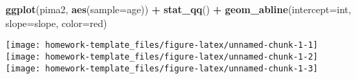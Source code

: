 \documentclass[
]{article}
\newenvironment{Shaded}{\begin{snugshade}}{\end{snugshade}}
\newcommand{\AttributeTok}[1]{\textcolor[rgb]{0.13,0.29,0.53}{#1}}
\newcommand{\FunctionTok}[1]{\textcolor[rgb]{0.13,0.29,0.53}{\textbf{#1}}}
\newcommand{\NormalTok}[1]{#1}
\newcommand{\SpecialCharTok}[1]{\textcolor[rgb]{0.81,0.36,0.00}{\textbf{#1}}}
\newcommand{\StringTok}[1]{\textcolor[rgb]{0.31,0.60,0.02}{#1}}
\begin{document}
\begin{enumerate}
\begin{Shaded}
\begin{Highlighting}[]
\FunctionTok{ggplot}\NormalTok{(pima2, }\FunctionTok{aes}\NormalTok{(}\AttributeTok{sample=}\NormalTok{age)) }\SpecialCharTok{+} \FunctionTok{stat\_qq}\NormalTok{() }\SpecialCharTok{+} 
    \FunctionTok{geom\_abline}\NormalTok{(}\AttributeTok{intercept=}\NormalTok{int, }\AttributeTok{slope=}\NormalTok{slope, }\AttributeTok{color=}\StringTok{\textquotesingle{}red\textquotesingle{}}\NormalTok{)}
\end{Highlighting}
\end{Shaded}

  \texttt{[image: homework-template\_files/figure-latex/unnamed-chunk-1-1]}
  \texttt{[image: homework-template\_files/figure-latex/unnamed-chunk-1-2]}
  \texttt{[image: homework-template\_files/figure-latex/unnamed-chunk-1-3]}
\end{enumerate}
\end{document}

